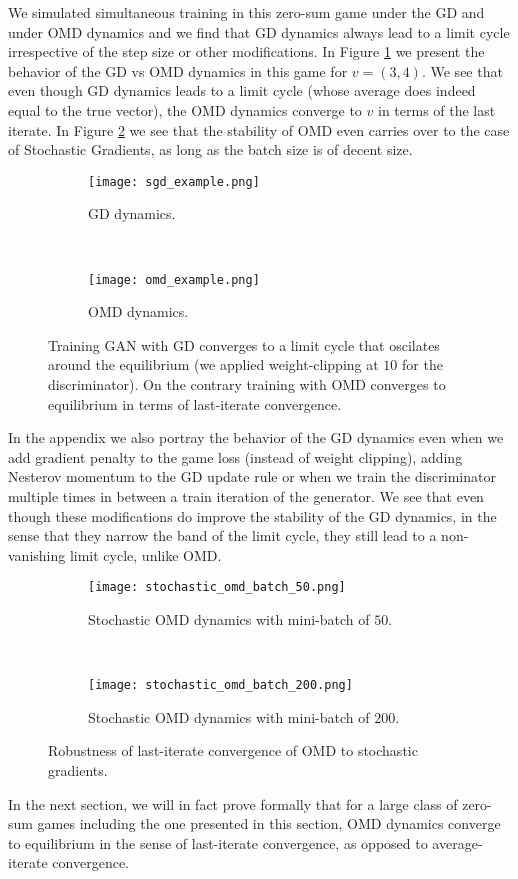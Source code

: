 We simulated simultaneous training in this zero-sum game under the GD and under OMD dynamics and we find that GD dynamics always lead to a limit cycle irrespective of the step size or other modifications. In Figure \ref{fig:gd} we present the behavior of the GD vs OMD dynamics in this game for $v = (3, 4)$. We see that even though GD dynamics leads to a limit cycle (whose average does indeed equal to the true vector), the OMD dynamics converge to $v$ in terms of the last iterate. In Figure \ref{fig:sampling} we see that the stability of OMD even carries over to the case of Stochastic Gradients, as long as the batch size is of decent size. 

\begin{figure}[htpb]
    \centering
    \begin{subfigure}[b]{.49\textwidth}
        \centering
        \texttt{[image: sgd\_example.png]}
        \caption{GD dynamics.}
    \end{subfigure}
    ~ 
    \begin{subfigure}[b]{.49\textwidth}
        \centering
        \texttt{[image: omd\_example.png]}
        \caption{OMD dynamics.}
    \end{subfigure}
    \caption{Training GAN with GD converges to a limit cycle that oscilates around the equilibrium (we applied weight-clipping at $10$ for the discriminator). On the contrary training with OMD converges to equilibrium in terms of last-iterate convergence.}\label{fig:gd}
\end{figure}

In the appendix we also portray the behavior of the GD dynamics even when we add gradient penalty \citep{Gulrajani2017} to the game loss (instead of weight clipping), adding Nesterov momentum to the GD update rule \citep{Nesterov} or when we train the discriminator multiple times in between a train iteration of the generator. We see that even though these modifications do improve the stability of the GD dynamics, in the sense that they narrow the band of the limit cycle, they still lead to a non-vanishing limit cycle, unlike OMD. 

\begin{figure}[htpb]
    \centering
    \begin{subfigure}[b]{.49\textwidth}
        \centering
        \texttt{[image: stochastic\_omd\_batch\_50.png]}
        \caption{Stochastic OMD dynamics with mini-batch of $50$.}
    \end{subfigure}
    ~ 
    \begin{subfigure}[b]{.49\textwidth}
        \centering
        \texttt{[image: stochastic\_omd\_batch\_200.png]}
        \caption{Stochastic OMD dynamics with mini-batch of $200$.}
    \end{subfigure}
    \caption{Robustness of last-iterate convergence of OMD to stochastic gradients.}\label{fig:sampling}
\end{figure}

In the next section, we will in fact prove formally that for a large class of zero-sum games including the one presented in this section, OMD dynamics converge to  equilibrium in the sense of last-iterate convergence, as opposed to average-iterate convergence.